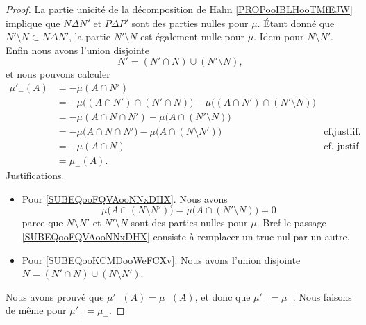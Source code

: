 \begin{proof}
	La partie unicité de la décomposition de Hahn \ref{PROPooIBLHooTMfEJW} implique que \( N\Delta N'\) et \( P\Delta P'\) sont des parties nulles pour \( \mu\). Étant donné que \( N'\setminus N\subset N\Delta N'\), la partie \( N'\setminus N\) est également nulle pour \( \mu\). Idem pour \( N\setminus N'\). Enfin nous avons l'union disjointe
	\begin{equation}
		N'=(N'\cap N)\cup(N'\setminus N),
	\end{equation}
	et nous pouvons calculer
	\begin{subequations}
		\begin{align}
			\mu'_-(A) & = - \mu(A\cap N')                                                                                                                            \\
			          & = - \mu\big((A\cap N')\cap (N'\cap N)\big)-\mu\big(  (A\cap N')\cap (N'\setminus N)  \big)                                                   \\
			          & = - \mu(A\cap N\cap N') - \mu\big(  A\cap (N'\setminus N) \big)                                                                              \\
			          & = - \mu\big(   A\cap N\cap N' \big)-\mu\big(  A\cap (N\setminus N')  \big)                 & \text{cf.justiif.}  \label{SUBEQooFQVAooNNxDHX} \\
			          & = - \mu(A\cap N)                                                                           & \text{cf. justif}	\label{SUBEQooKCMDooWeFCXv}    \\
			          & = \mu_-(A).
		\end{align}
	\end{subequations}
	Justifications.
	\begin{itemize}
		\item
		      Pour \eqref{SUBEQooFQVAooNNxDHX}. Nous avons
		      \begin{equation}
			      \mu\big( A\cap (N\setminus N') \big)=\mu\big( A\cap (N'\setminus N) \big)=0
		      \end{equation}
		      parce que \( N\setminus N'\) et \( N'\setminus N\) sont des parties nulles pour \( \mu\). Bref le passage \eqref{SUBEQooFQVAooNNxDHX} consiste à remplacer un truc nul par un autre.
		\item
		      Pour \eqref{SUBEQooKCMDooWeFCXv}. Nous avons l'union disjointe \( N=(N'\cap N)\cup(N\setminus N')\).
	\end{itemize}
	Nous avons prouvé que \( \mu'_-(A)=\mu_-(A)\), et donc que \( \mu'_-=\mu_-\). Nous faisons de même pour \( \mu'_+=\mu_+\).
\end{proof}


